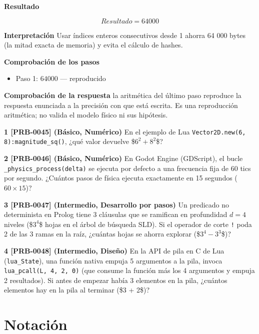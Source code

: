\documentclass{book}
\begin{document}
\begin{tcolorbox}[title={Problema resuelto}, studiumworked, breakable]
\noindent\textbf{Resultado}

\[
Resultado = 64000
\]

\noindent\textbf{Interpretación}
Usar índices enteros consecutivos desde 1 ahorra 64 000 bytes (la mitad exacta de memoria) y evita el cálculo de hashes.

\noindent\textbf{Comprobación de los pasos}
\begin{itemize}
\item Paso 1: $64000$ — reproducido
\end{itemize}

\noindent\textbf{Comprobación de la respuesta} la aritmética del último paso reproduce la respuesta enunciada a la precisión con que está escrita. Es una reproducción aritmética; no valida el modelo físico ni sus hipótesis.
\end{tcolorbox}

\begin{tcolorbox}[title={Ejercicios}, studiumworked, breakable]

\noindent\textbf{1 [PRB-0045] (Básico, Numérico)}
En el ejemplo de Lua \texttt{Vector2D.new(6, 8):magnitude\_sq()}, ¿qué valor devuelve \$\(6^2 + 8^2\)\$?

\noindent\textbf{2 [PRB-0046] (Básico, Numérico)}
En Godot Engine (GDScript), el bucle \texttt{\_physics\_process(delta)} se ejecuta por defecto a una frecuencia fija de 60 tics por segundo. ¿Cuántos pasos de física ejecuta exactamente en 15 segundos (\(60 \times 15\))?

\noindent\textbf{3 [PRB-0047] (Intermedio, Desarrollo por pasos)}
Un predicado no determinista en Prolog tiene 3 cláusulas que se ramifican en profundidad \(d = 4\) niveles (\$\(3^4\)\$ hojas en el árbol de búsqueda SLD). Si el operador de corte \texttt{!} poda 2 de las 3 ramas en la raíz, ¿cuántas hojas se ahorra explorar (\$\(3^4 - 3^3\)\$)?

\noindent\textbf{4 [PRB-0048] (Intermedio, Diseño)}
En la API de pila en C de Lua (\texttt{lua\_State}), una función nativa empuja 5 argumentos a la pila, invoca \texttt{lua\_pcall(L, 4, 2, 0)} (que consume la función más los 4 argumentos y empuja 2 resultados). Si antes de empezar había 3 elementos en la pila, ¿cuántos elementos hay en la pila al terminar (\$3 + 2\$)?
\end{tcolorbox}
\appendix
\chapter{Notación}
\end{document}
